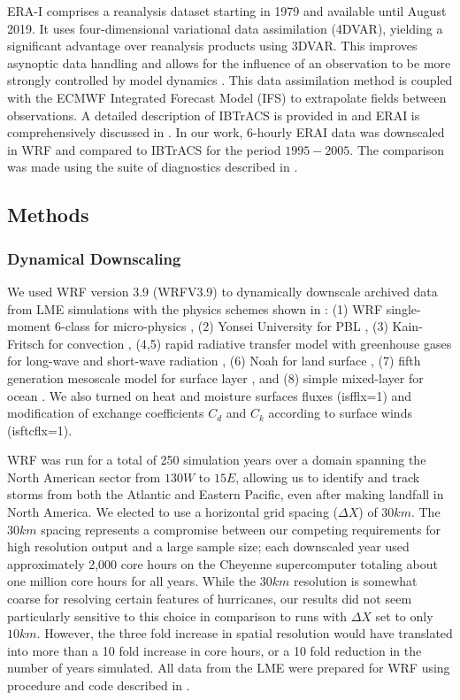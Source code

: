 \documentclass[phd,tocprelim]{cornell}
\begin{document}
ERA-I comprises a reanalysis dataset starting in 1979 and available
until August 2019. It uses four-dimensional variational data
assimilation (4DVAR), yielding a significant advantage over reanalysis
products using 3DVAR. This improves asynoptic data handling and allows
for the influence of an observation to be more strongly controlled by
model dynamics \cite{tc_reanal:2}. This data assimilation method is
coupled with the ECMWF Integrated Forecast Model (IFS) to extrapolate
fields between observations. A detailed description of IBTrACS is
provided in \cite{ibtracs} and ERAI is comprehensively discussed in
\cite{erai_reanal}. In our work, $6$-hourly ERAI data was downscaled
in WRF and compared to IBTrACS for the period $1995-2005$. The
comparison was made using the suite of diagnostics described in
.

\subsection{Methods}
\subsubsection{Dynamical Downscaling}\label{WRF}

We used WRF version 3.9 (WRFV3.9) \cite{wrf_tech} to dynamically
downscale archived data from LME simulations with the physics schemes
shown in : (1) WRF single-moment 6-class for
micro-physics \cite{mp_phys}, (2) Yonsei University for PBL
\cite{pbl_phys}, (3) Kain-Fritsch for convection \cite{cu_phys}, (4,5)
rapid radiative transfer model with greenhouse gases for long-wave and
short-wave radiation \cite{rad_phys}, (6) Noah for land surface
\cite{sfc_phys}, (7) fifth generation mesoscale model for surface
layer \cite{sfclay_phys:1,sfclay_phys:2,sfclay_phys:3}, and
(8) simple mixed-layer for ocean \cite{ocn_phys}. We also turned on
heat and moisture surfaces fluxes (isfflx=1) and modification of
exchange coefficients $C_d$ and $C_k$ according to surface winds
(isftcflx=1).

WRF was run for a total of 250 simulation years over a domain spanning
the North American sector from $130W$ to $15E$, allowing us to
identify and track storms from both the Atlantic and Eastern Pacific,
even after making landfall in North America. We elected to use a
horizontal grid spacing ($\Delta X$) of $30km$. The $30km$ spacing
represents a compromise between our competing requirements for high
resolution output and a large sample size; each downscaled year used
approximately 2,000 core hours on the Cheyenne supercomputer totaling
about one million core hours for all years. While the $30km$
resolution is somewhat coarse for resolving certain features of
hurricanes, our results did not seem particularly sensitive to this
choice in comparison to runs with $\Delta X$ set to only $10km$. However, the
three fold increase in spatial resolution would have translated into
more than a 10 fold increase in core hours, or a 10 fold reduction in
the number of years simulated. All data from the LME were prepared for WRF 
using procedure and code described in \cite{tech_notes}.
\end{document}
